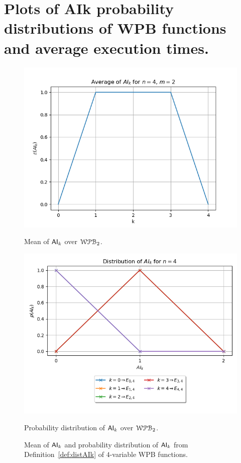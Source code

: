 \documentclass[11pt]{llncs}
\begin{document}
\section{Plots of AIk probability distributions of WPB functions and average execution times.}\label{appendix:distPlots}

\begin{figure}[H]
    \centering
    \begin{minipage}[b]{0.45\textwidth}
        \centering
        \includegraphics[width=\textwidth]{images/WPB_2_sample_size_full_dist.png}
        \caption{Mean of $\mathsf{AI}_{k}$ over $\mathcal{WPB}_{2}$.}
        \label{fig:averagesFullDist}
    \end{minipage}
    \hfill
    \begin{minipage}[b]{0.5\textwidth}
        \centering
        \includegraphics[width=\textwidth]{images/WPB_2_sample_size_full_dist_prob.png}
        \caption{Probability distribution of $\mathsf{AI}_{k}$  over $\mathcal{WPB}_{2}$.}
        \label{fig:probFullDist}
    \end{minipage}
    \caption{Mean of $\mathsf{AI}_{k}$ and probability distribution of $\mathsf{AI}_{k}$ from Definition~\ref{def:distAIk} of $4$-variable WPB functions.}
    \label{fig:dullDist}
\end{figure}
\end{document}
